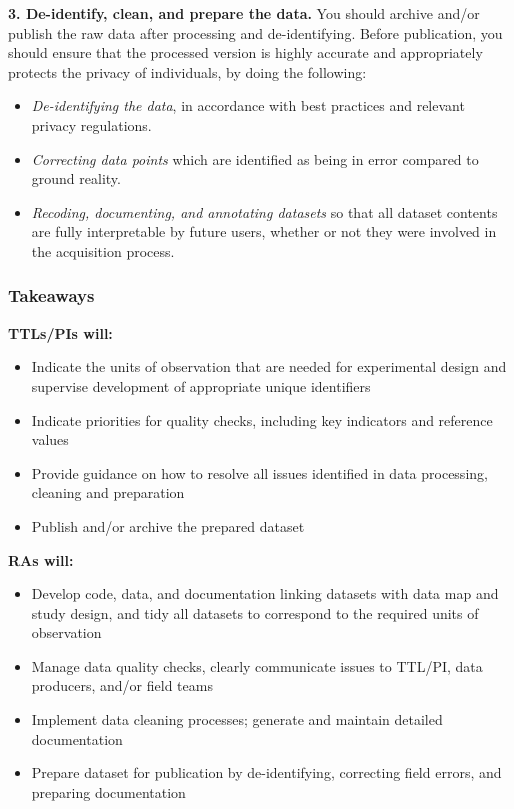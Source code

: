\documentclass[
]{book}
\providecommand{\tightlist}{%
  \setlength{\itemsep}{0pt}\setlength{\parskip}{0pt}}
\begin{document}
\begin{summary}
\textbf{3. De-identify, clean, and prepare the data.} You should archive and/or publish the raw data after processing and de-identifying. Before publication, you should ensure that the processed version is highly accurate and appropriately protects the privacy of individuals, by doing the following:

\begin{itemize}
\tightlist
\item
  \emph{De-identifying the data}, in accordance with best practices and relevant privacy regulations.
\item
  \emph{Correcting data points} which are identified as being in error compared to ground reality.
\item
  \emph{Recoding, documenting, and annotating datasets} so that all dataset contents are fully interpretable by future users, whether or not they were involved in the acquisition process.
\end{itemize}

\hypertarget{takeaways-4}{%
\subsubsection*{Takeaways}\label{takeaways-4}}

\textbf{TTLs/PIs will:}

\begin{itemize}
\tightlist
\item
  Indicate the units of observation that are needed for experimental design and supervise development of appropriate unique identifiers
\item
  Indicate priorities for quality checks, including key indicators and reference values
\item
  Provide guidance on how to resolve all issues identified in data processing, cleaning and preparation
\item
  Publish and/or archive the prepared dataset
\end{itemize}

\textbf{RAs will: }

\begin{itemize}
\tightlist
\item
  Develop code, data, and documentation linking datasets with data map and study design, and tidy all datasets to correspond to the required units of observation
\item
  Manage data quality checks, clearly communicate issues to TTL/PI, data producers, and/or field teams
\item
  Implement data cleaning processes; generate and maintain detailed documentation
\item
  Prepare dataset for publication by de-identifying, correcting field errors, and preparing documentation
\end{itemize}


\end{summary}
\end{document}
